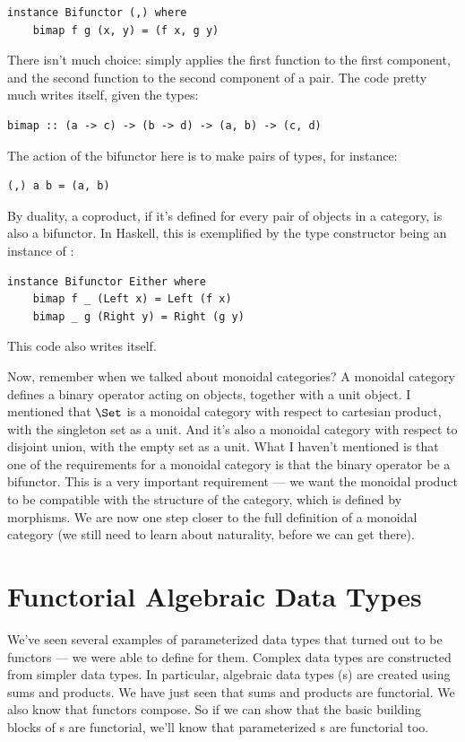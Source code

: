 \begin{Verbatim}
instance Bifunctor (,) where 
    bimap f g (x, y) = (f x, g y)
\end{Verbatim}
There isn't much choice:  simply applies the first
function to the first component, and the second function to the second
component of a pair. The code pretty much writes itself, given the
types:

\begin{Verbatim}
bimap :: (a -> c) -> (b -> d) -> (a, b) -> (c, d)
\end{Verbatim}
The action of the bifunctor here is to make pairs of types, for
instance:

\begin{Verbatim}
(,) a b = (a, b)
\end{Verbatim}
By duality, a coproduct, if it's defined for every pair of objects in a
category, is also a bifunctor. In Haskell, this is exemplified by the
 type constructor being an instance of
:

\begin{Verbatim}
instance Bifunctor Either where
    bimap f _ (Left x) = Left (f x)
    bimap _ g (Right y) = Right (g y)
\end{Verbatim}
This code also writes itself.

Now, remember when we talked about monoidal categories? A monoidal
category defines a binary operator acting on objects, together with a
unit object. I mentioned that $\Set$ is a monoidal category with
respect to cartesian product, with the singleton set as a unit. And it's
also a monoidal category with respect to disjoint union, with the empty
set as a unit. What I haven't mentioned is that one of the requirements
for a monoidal category is that the binary operator be a bifunctor. This
is a very important requirement --- we want the monoidal product to be
compatible with the structure of the category, which is defined by
morphisms. We are now one step closer to the full definition of a
monoidal category (we still need to learn about naturality, before we
can get there).

\section{Functorial Algebraic Data Types}

We've seen several examples of parameterized data types that turned out
to be functors --- we were able to define  for them.
Complex data types are constructed from simpler data types. In
particular, algebraic data types (s) are created using sums and
products. We have just seen that sums and products are functorial. We
also know that functors compose. So if we can show that the basic
building blocks of s are functorial, we'll know that parameterized
s are functorial too.


